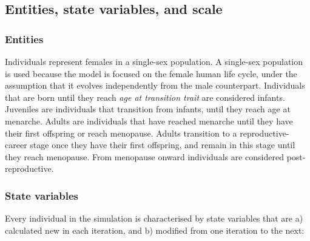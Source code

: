 \documentclass{article}
\begin{document}
\subsection{Entities, state variables, and scale}

\subsubsection{Entities}

Individuals represent females in a single-sex population. A single-sex population is used because the model is focused on the female human life cycle, under the assumption that it evolves independently from the male counterpart. Individuals that are born until they reach \emph{age at transition trait} are considered infants. Juveniles are individuals that transition from infants, until they reach age at menarche. Adults are individuals that have reached menarche until they have their first offspring or reach menopause. Adults transition to a reproductive-career stage once they have their first offspring, and remain in this stage until they reach menopause. From menopause onward individuals are considered post-reproductive.

\subsubsection{State variables}

Every individual in the simulation is characterised by state variables that are a) calculated new in each iteration, and b) modified from one iteration to the next:
\end{document}
